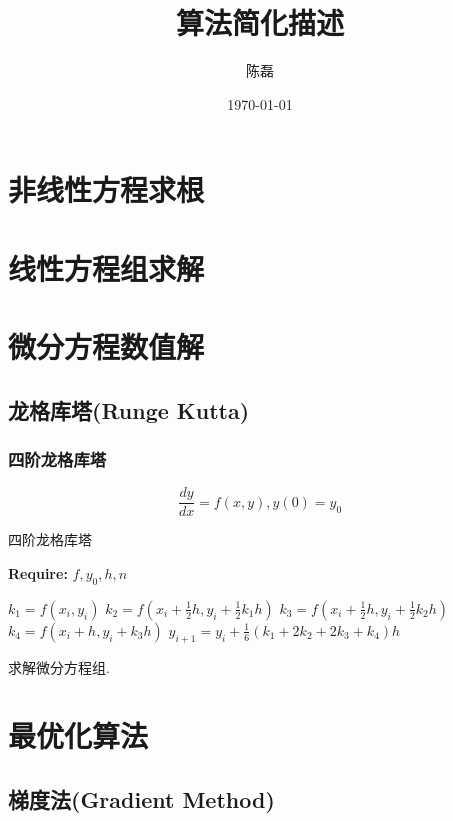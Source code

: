 \documentclass[a4paper,11pt,oneside]{book}
\begin{document}
\title{算法简化描述}
\author{陈磊}
\date{\today}

\maketitle
\frontmatter

\tableofcontents
\listofalgorithms

\mainmatter

\chapter{非线性方程求根}

\chapter{线性方程组求解}

\chapter{微分方程数值解}

\section{龙格库塔(Runge Kutta)}
\subsection{四阶龙格库塔}
\begin{equation}
	\frac{dy}{dx}=f(x,y), y(0)=y_0
\end{equation}

\begin{algorithm}
\caption{四阶龙格库塔} %
{\bf Require:} $f, y_0, h, n$
\begin{algorithmic}[1]
	\State $k_1=f(x_i,y_i)$
	\State $k_2=f(x_i+\frac{1}{2}h,y_i+\frac{1}{2}k_1h)$
	\State $k_3=f(x_i+\frac{1}{2}h,y_i+\frac{1}{2}k_2h)$
	\State $k_4=f(x_i+h,y_i+k_3h)$
	\State $y_{i+1} = y_i + \frac{1}{6}(k_1+2k_2+2k_3+k_4)h$
\EndFor
\end{algorithmic}
\end{algorithm}

求解微分方程组.

\chapter{最优化算法}
\section{梯度法(Gradient Method)}
\end{document}
